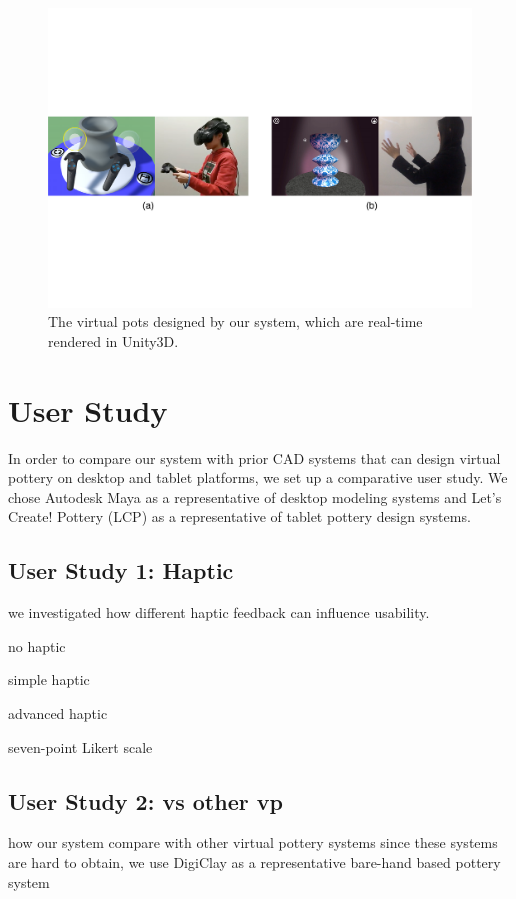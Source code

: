 \documentclass{svjour3}                     %
\begin{document}
\begin{figure}
\includegraphics[width=\textwidth]{fig13}
\caption{The virtual pots designed by our system, which are real-time rendered in Unity3D.}
\label{fig:pots}
\end{figure}

\section{User Study}
\label{sec:6}
In order to compare our system with prior CAD systems that can design virtual pottery on desktop and tablet platforms, we set up a comparative user study. We chose Autodesk Maya \cite{website:maya} as a representative of desktop modeling systems and Let's Create! Pottery (LCP) \cite{website:letspottery} as a representative of tablet pottery design systems.

\subsection{User Study 1: Haptic}
\label{sec:6.1}
we investigated how different haptic feedback can influence usability.

no haptic

simple haptic

advanced haptic


seven-point Likert scale




\subsection{User Study 2: vs other vp}
\label{sec:6.2}
how our system compare with other virtual pottery systems
since these systems are hard to obtain, we use DigiClay as a representative bare-hand based pottery system 
\end{document}
